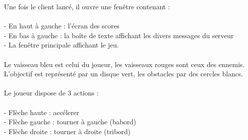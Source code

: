 \documentclass{article}
\begin{document}
Une fois le client lancé, il ouvre une fenêtre contenant :\\
\\
- En haut à gauche : l'écran des scores\\
- En bas à gauche : la boîte de texte affichant les divers messages du serveur\\
- La fenêtre principale affichant le jeu.\\
\\
Le vaisseau bleu est celui du joueur, les vaisseaux rouges sont ceux des ennemis. L'objectif est représenté par un disque vert, les obstacles par des cercles blancs.\\
\\
Le joueur dispose de 3 actions :\\
\\
- Flèche haute : accélerer\\
- Flèche gauche : tourner à gauche (babord)\\
- Flèche droite : tourner à droite (tribord)\\
\end{document}
